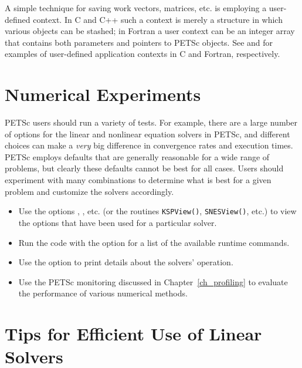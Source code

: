 {{A simple technique for saving work vectors, matrices, etc. is employing
a user-defined context.  In C and C++ such a context is merely a
structure in which various objects can be stashed; in Fortran a user
context can be an integer array that contains both parameters and pointers
to PETSc objects. See \href{http://www.mcs.anl.gov/petsc/petsc-current/src/snes/examples/tutorials/ex5.c.html}{} and
\href{http://www.mcs.anl.gov/petsc/petsc-current/src/snes/examples/tutorials/ex5f.F.html}{} for examples of user-defined application
contexts in C and Fortran, respectively.

\section{Numerical Experiments}

PETSc users should run a variety of tests.  For example, there are a large number of options
for the linear and nonlinear equation solvers in PETSc, and different
choices can make a {\em very} big difference in convergence rates and execution
times.  PETSc employs defaults that are generally reasonable for a wide
range of problems, but clearly these defaults cannot be best for all
cases.  Users should experiment with many combinations to determine
what is best for a given problem and customize the solvers accordingly.
\begin{itemize}
\item Use the options , , etc. (or the routines
     \lstinline{KSPView()}, \lstinline{SNESView()}, etc.) to view the options that have been
     used for a particular solver.
\item Run the code with the option  for a list of the available
     runtime commands.
\item Use the option  to print details about the solvers' operation.
\item Use the PETSc monitoring discussed in Chapter~\ref{ch_profiling}
     to evaluate the performance of various numerical methods.
\end{itemize}

\section{Tips for Efficient Use of Linear Solvers}
\label{sec_slestips}

}}
